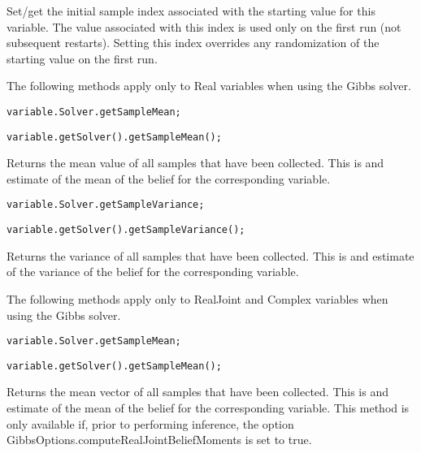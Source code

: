 Set/get the initial sample index associated with the starting value for this variable.  The value associated with this index is used only on the first run (not subsequent restarts).  Setting this index overrides any randomization of the starting value on the first run.


The following methods apply only to Real variables when using the Gibbs solver.

\ifmatlab
\begin{lstlisting}
variable.Solver.getSampleMean;
\end{lstlisting}
\fi

\ifjava
\begin{lstlisting}
variable.getSolver().getSampleMean();
\end{lstlisting}
\fi

Returns the mean value of all samples that have been collected.  This is and estimate of the mean of the belief for the corresponding variable.

\ifmatlab
\begin{lstlisting}
variable.Solver.getSampleVariance;
\end{lstlisting}
\fi

\ifjava
\begin{lstlisting}
variable.getSolver().getSampleVariance();
\end{lstlisting}
\fi

Returns the variance of all samples that have been collected.  This is and estimate of the variance of the belief for the corresponding variable.


The following methods apply only to RealJoint and Complex variables when using the Gibbs solver.

\ifmatlab
\begin{lstlisting}
variable.Solver.getSampleMean;
\end{lstlisting}
\fi

\ifjava
\begin{lstlisting}
variable.getSolver().getSampleMean();
\end{lstlisting}
\fi

Returns the mean vector of all samples that have been collected.  This is and estimate of the mean of the belief for the corresponding variable.  This method is only available if, prior to performing inference, the option GibbsOptions.computeRealJointBeliefMoments is set to true.

